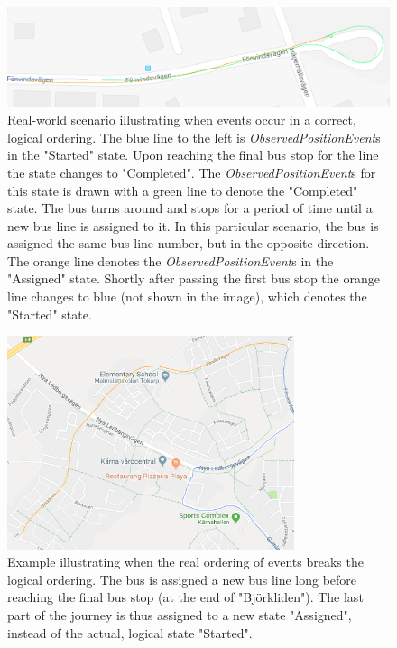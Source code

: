 \begin{figure}[h!]
    \centering
    \includegraphics[width=1\textwidth]{figures/assigned_completed_working}
    \caption{Real-world scenario illustrating when events occur in a correct, logical ordering.
    The blue line to the left is \textit{ObservedPositionEvent}s in the "Started" state.
    Upon reaching the final bus stop for the line the state changes to "Completed".
    The \textit{ObservedPositionEvent}s for this state is drawn with a green line to denote the "Completed" state.
    The bus turns around and stops for a period of time until a new bus line is assigned to it.
    In this particular scenario, the bus is assigned the same bus line number, but in the opposite direction.
    The orange line denotes the \textit{ObservedPositionEvent}s in the "Assigned" state.
    Shortly after passing the first bus stop the orange line changes to blue (not shown in the image), which denotes the "Started" state.}
    \label{fig:assigned-before-completed-working}
\end{figure}

\begin{figure}[t!]
    \centering
    \includegraphics[width=0.75\textwidth]{figures/assigned_completed_problem_long}
    \caption{Example illustrating when the real ordering of events breaks the logical ordering.
    The bus is assigned a new bus line long before reaching the final bus stop (at the end of "Björkliden").
    The last part of the journey is thus assigned to a new state "Assigned", instead of the actual, logical state "Started".}
    \label{fig:assigned-before-completed-long}
\end{figure}

